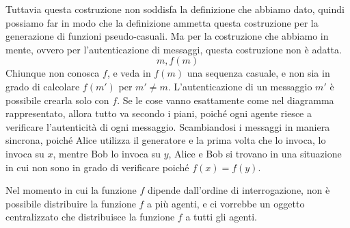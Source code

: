 Tuttavia questa costruzione non soddisfa la definizione che abbiamo dato, quindi possiamo 
far in modo che la definizione ammetta questa costruzione per la generazione di funzioni
pseudo-casuali. Ma per la costruzione che abbiamo in mente, ovvero per l'autenticazione di 
messaggi, questa costruzione non è adatta.
\[
  m, f(m)
\]
Chiunque non conosca $f$, e veda in $f(m)$ una sequenza casuale, 
e non sia in grado di calcolare $f(m')$ per $m' \neq m$. L'autenticazione di 
un messaggio $m'$ è possibile crearla solo con $f$.
Se le cose vanno esattamente come nel diagramma rappresentato, 
allora tutto va secondo i piani, poiché ogni agente riesce a verificare l'autenticità
di ogni messaggio.
Scambiandosi i messaggi in maniera sincrona, poiché Alice utilizza il generatore 
e la prima volta che lo invoca, lo invoca su $x$, mentre Bob lo invoca su $y$,
Alice e Bob si trovano in una situazione in cui non sono in grado di verificare
poiché $f(x) = f(y)$.

Nel momento in cui la funzione $f$ dipende dall'ordine di interrogazione,
non è possibile distribuire la funzione $f$ a più agenti, e ci vorrebbe 
un oggetto centralizzato che distribuisce la funzione $f$ a tutti gli agenti.

